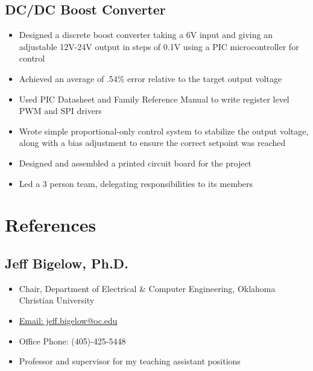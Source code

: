 \documentclass{article}
\begin{document}
\begin{spacing}{.5}
	\subsection{DC/DC Boost Converter \hfill {}}
		\begin{itemize}[label=--,itemsep=-.35ex]
			\item \large{Designed a discrete boost converter taking a 6V input and giving an adjustable 12V-24V output in steps of 0.1V using a PIC microcontroller for control}
			\item \large{Achieved an average of .54\% error relative to the target output voltage}
			\item \large{Used PIC Datasheet and Family Reference Manual to write register level PWM and SPI drivers}
			\item \large{Wrote simple proportional-only control system to stabilize the output voltage, along with a bias adjustment to ensure the correct setpoint was reached}
			\item \large{Designed and assembled a printed circuit board for the project}
			\item \large{Led a 3 person team, delegating responsibilities to its members}
		\end{itemize}

\section{References}
	\subsection{Jeff Bigelow, Ph.D.}
		\begin{itemize}[label=--,itemsep=-.35ex]
			\item \large{Chair, Department of Electrical \& Computer Engineering, Oklahoma Christian University}
			\item \large{\href{mailto::jeff.bigelow@oc.edu}{\large{Email: jeff.bigelow@oc.edu}}}
			\item \large{Office Phone: (405)-425-5448}
			\item \large{Professor and supervisor for my teaching assistant positions}
		\end{itemize}

\end{spacing}
\end{document}
